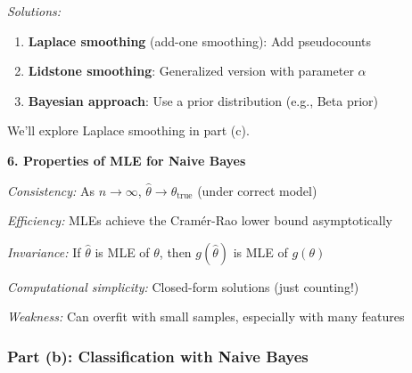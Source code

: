 \documentclass[12pt]{article}
\begin{document}
\begin{explanation}
\textit{Solutions:}
\begin{enumerate}
    \item \textbf{Laplace smoothing} (add-one smoothing): Add pseudocounts
    \item \textbf{Lidstone smoothing}: Generalized version with parameter $\alpha$
    \item \textbf{Bayesian approach}: Use a prior distribution (e.g., Beta prior)
\end{enumerate}

We'll explore Laplace smoothing in part (c).

\textbf{6. Properties of MLE for Naive Bayes}

\textit{Consistency:} As $n \to \infty$, $\hat{\theta} \to \theta_{\text{true}}$ (under correct model)

\textit{Efficiency:} MLEs achieve the Cramér-Rao lower bound asymptotically

\textit{Invariance:} If $\hat{\theta}$ is MLE of $\theta$, then $g(\hat{\theta})$ is MLE of $g(\theta)$

\textit{Computational simplicity:} Closed-form solutions (just counting!)

\textit{Weakness:} Can overfit with small samples, especially with many features
\end{explanation}

\subsubsection{Part (b): Classification with Naive Bayes}
\end{document}
